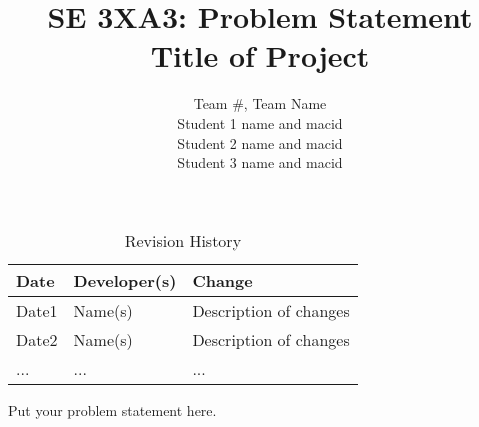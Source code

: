 \documentclass{article}
\title{SE 3XA3: Problem Statement\\Title of Project}
\author{Team \#, Team Name
		\\ Student 1 name and macid
		\\ Student 2 name and macid
		\\ Student 3 name and macid
}
\date{}
\begin{document}
\begin{table}[hp]
\caption{Revision History} \label{TblRevisionHistory}
\begin{tabularx}{\textwidth}{llX}
\toprule
\textbf{Date} & \textbf{Developer(s)} & \textbf{Change}\\
\midrule
Date1 & Name(s) & Description of changes\\
Date2 & Name(s) & Description of changes\\
... & ... & ...\\
\bottomrule
\end{tabularx}
\end{table}

\newpage

\maketitle

Put your problem statement here.





\end{document}
